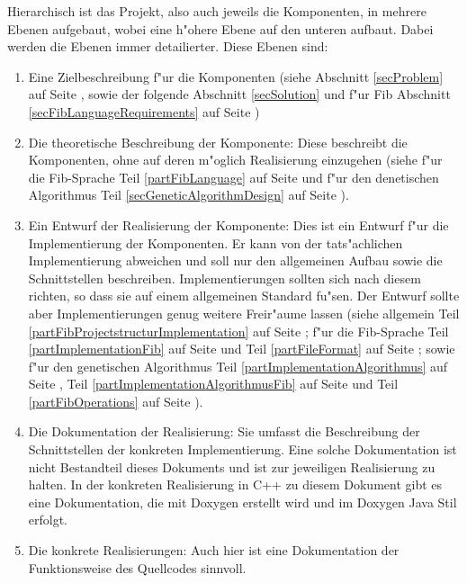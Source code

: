 \documentclass[11pt,a4paper]{article}
\begin{document}
Hierarchisch ist das Projekt, also auch jeweils die Komponenten, in mehrere Ebenen aufgebaut, wobei eine h"ohere Ebene auf den unteren aufbaut. Dabei werden die Ebenen immer detailierter.
\bigskip\noindent
Diese Ebenen sind:
\begin{enumerate}
 \item Eine Zielbeschreibung f"ur die Komponenten (siehe Abschnitt \ref{secProblem} auf Seite \pageref{secProblem}, sowie der folgende Abschnitt \ref{secSolution} und f"ur Fib Abschnitt \ref{secFibLanguageRequirements} auf Seite \pageref{secFibLanguageRequirements} )
 \item Die theoretische Beschreibung der Komponente: Diese beschreibt die Komponenten, ohne auf deren m"oglich Realisierung einzugehen (siehe f"ur die Fib-Sprache Teil \ref{partFibLanguage} auf Seite \pageref{partFibLanguage} und f"ur den denetischen Algorithmus Teil \ref{secGeneticAlgorithmDesign} auf Seite \pageref{secGeneticAlgorithmDesign}).
 \item Ein Entwurf der Realisierung der Komponente: Dies ist ein Entwurf f"ur die Implementierung der Komponenten. Er kann von der tats"achlichen Implementierung abweichen und soll nur den allgemeinen Aufbau sowie die Schnittstellen beschreiben. Implementierungen sollten sich nach diesem richten, so dass sie auf einem allgemeinen Standard fu"sen. Der Entwurf sollte aber Implementierungen genug weitere Freir"aume lassen (siehe allgemein Teil \ref{partFibProjectstructurImplementation} auf Seite \pageref{partFibProjectstructurImplementation}; f"ur die Fib-Sprache Teil \ref{partImplementationFib} auf Seite \pageref{partImplementationFib} und Teil \ref{partFileFormat} auf Seite \pageref{partFileFormat}; sowie f"ur den genetischen Algorithmus Teil \ref{partImplementationAlgorithmus} auf Seite \pageref{partImplementationAlgorithmus}, Teil \ref{partImplementationAlgorithmusFib} auf Seite \pageref{partImplementationAlgorithmusFib} und Teil \ref{partFibOperations} auf Seite \pageref{partFibOperations}).
 \item Die Dokumentation der Realisierung: Sie umfasst die Beschreibung der Schnittstellen der konkreten Implementierung. Eine solche Dokumentation ist nicht Bestandteil dieses Dokuments und ist zur jeweiligen Realisierung zu halten. In der konkreten Realisierung in C++ zu diesem Dokument gibt es eine Dokumentation, die mit Doxygen erstellt wird und im Doxygen Java Stil erfolgt.
 \item Die konkrete Realisierungen: Auch hier ist eine Dokumentation der Funk\-tions\-weise des Quellcodes sinnvoll.
\end{enumerate}
\end{document}
